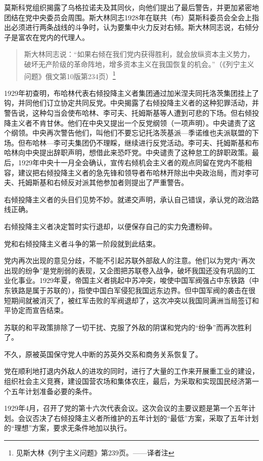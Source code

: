 莫斯科党组织揭露了乌格拉诺夫及其同伙，向他们提出了最后警告，并更加紧密地团结在党中央委员会周围。斯大林同志1928年在联共（布）莫斯科委员会全会上指出必须进行两条战线的斗争时，认为要集中火力反对右倾。斯大林同志说，右倾分子是富农在党内的代理人。

\begin{quotation}
斯大林同志说：“如果右倾在我们党内获得胜利，就会放纵资本主义势力，破坏无产阶级的革命阵地，增多资本主义在我国恢复的机会。”（《列宁主义问题》俄文第10版第234页）\footnote{见斯大林《列宁主义问题》第239页。——译者注}
\end{quotation}

1929年初查明，布哈林代表右倾投降主义者集团通过加米涅夫同托洛茨集团挂上了钩，并同他们订立协定共同反党。中央揭露了右倾投降主义者的这种犯罪活动，并警告说，这种勾当会使布哈林、李可夫、托姆斯基等人遭到可悲的下场。但右倾投降主义者不肯甘休。他们在中央又提出一个反党纲领（一项声明）。中央谴责了这个纲领。中央再次警告他们，叫他们不要忘记托洛茨基派—季诺维也夫派联盟的下场。但布哈林—李可夫集团仍不理睬，继续进行反党活动。李可夫、托姆斯基和布哈林向中央提出辞职声明，想借此来恐吓党。中央谴责了这种怠工的辞职政策。最后，1929年中央十一月全会确认，宣传右倾机会主义者的观点同留在党内不能相容，建议把右倾投降主义者的急先锋和领导者布哈林开除出中央政治局，而对李可夫、托姆斯基和右倾反对派其他参加者则提出了严重警告。

右倾投降主义者的头目们见势不妙。就递交声明，承认自己错误，承认党的政治路线正确。

右倾投降主义者决定暂时实行退却，以便保存自己的实力免遭粉碎。

党和右倾投降主义者斗争的第一阶段就到此结束。

党内再次出现的意见分歧，不能不引起苏联外部敌人的注意。他们以为党内“再次出现的纷争”是党削弱的表现，又企图把苏联卷入战争，破坏我国还没有巩固的工业化事业。1929年夏，帝国主义者挑起中苏冲突，唆使中国军阀强占中东铁路（中东铁路是属于苏联的），指使中国白军侵犯我国远东边界。但中国军阀的袭击在很短期间就被消灭了，被红军击败的军阀退却了，这次冲突以我国同满洲当局签订和平协定而宣告结束。

苏联的和平政策排除了一切干扰、克服了外敌的阴谋和党内的“纷争”而再次胜利了。

不久，原被英国保守党人中断的苏英外交系和商务关系恢复了。

党在顺利地打退内外敌人的进攻的同时，进行了大量的工作来开展重工业的建设，组织社会主义竞赛，建设国营农场和集体农庄，最后，为采取和实现国民经济第一个五年计划准备必要的条件。

1929年4月，召开了党的第十六次代表会议。这次会议的主要议题是第一个五年计划。会议否决了右倾投降主义者所维护的五年计划的“最低”方案，采取了五年计划的“理想”方案，要求无条件地加以执行。

